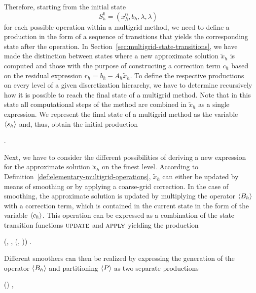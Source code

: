 Therefore, starting from the initial state 
\begin{equation*}
	S^0_h = (x_h^0, b_h, \lambda, \lambda)
\end{equation*}
for each possible operation within a multigrid method, we need to define a production in the form of a sequence of transitions that yields the corresponding state after the operation.
In Section~\ref{sec:multigrid-state-transitions}, we have made the distinction between states where a new approximate solution $\tilde{x}_h$ is computed and those with the purpose of constructing a correction term $c_h$ based on the residual expression $r_h = b_h - A_h \tilde{x}_h$.
To define the respective productions on every level of a given discretization hierarchy, we have to determine recursively how it is possible to reach the final state of a multigrid method.
Note that in this state all computational steps of the method are combined in $\tilde{x}_h$ as a single expression.
We represent the final state of a multigrid method as the variable $\langle s_h \rangle$ and, thus, obtain the initial production
\begin{bnf}
	 {
	}.
\end{bnf}
Next, we have to consider the different possibilities of deriving a new expression for the approximate solution $\tilde{x}_{h}$ on the finest level.
According to Definition~\ref{def:elementary-multigrid-operations}, $\tilde{x}_{h}$ can either be updated by means of smoothing or by applying a coarse-grid correction.
In the case of smoothing, the approximate solution is updated by multiplying the operator $\langle B_h \rangle$ with a correction term, which is contained in the current state in the form of the variable $\langle c_h \rangle$.
This operation can be expressed as a combination of the state transition functions $\textsc{update}$ and $\textsc{apply}$ yielding the production
\begin{bnf}
	 {
		(\bnfts{$\omega$}, \bnfsp {}, \bnfsp {}(, \bnfsp {}))
	}.
\label{prod:smoothing}
\end{bnf}
Different smoothers can then be realized by expressing the generation of the operator $\langle B_h \rangle$ and partitioning $\langle P \rangle$ as two separate productions
\begin{bnf}
	 {
		() \bnfsp {} \bnfsp {}
	},
\label{prod:smoothing-operator}
\end{bnf}
